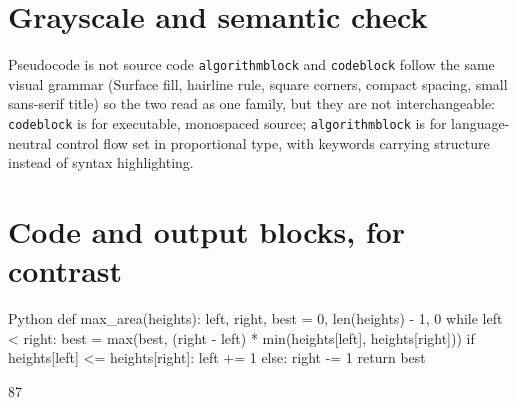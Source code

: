 \documentclass{reportkit}
\begin{document}
\section{Grayscale and semantic check}
\begin{principle}{Pseudocode is not source code}
\texttt{algorithmblock} and \texttt{codeblock} follow the same visual grammar
(Surface fill, hairline rule, square corners, compact spacing, small
sans-serif title) so the two read as one family, but they are not
interchangeable: \texttt{codeblock} is for executable, monospaced source;
\texttt{algorithmblock} is for language-neutral control flow set in
proportional type, with keywords carrying structure instead of syntax
highlighting.
\end{principle}

\section{Code and output blocks, for contrast}
\begin{codeblock}{Python}
def max_area(heights):
    left, right, best = 0, len(heights) - 1, 0
    while left < right:
        best = max(best, (right - left) * min(heights[left], heights[right]))
        if heights[left] <= heights[right]:
            left += 1
        else:
            right -= 1
    return best
\end{codeblock}

\begin{outputblock}
87
\end{outputblock}
\end{document}
